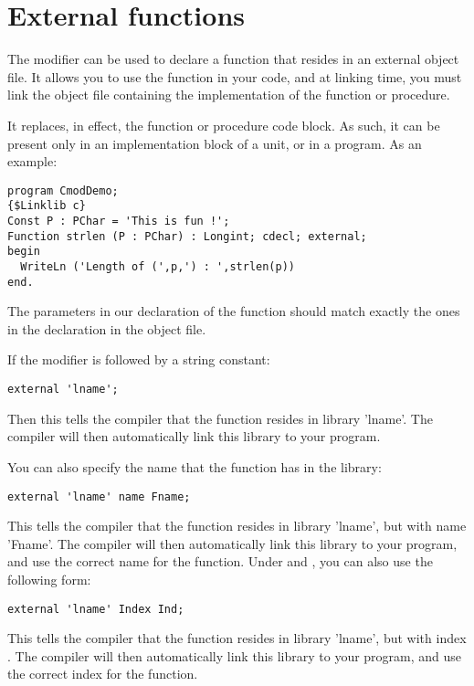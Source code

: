 \documentclass{report}
\begin{document}
\section{External functions}
\label{se:external}
The  modifier can be used to declare a function that resides in
an external object file. It allows you to use the function in
your code, and at linking time, you must link the object file containing the
implementation of the function or procedure.

It replaces, in effect, the function or procedure code block. As such, it
can be present only in an implementation block of a unit, or in a program.
As an example:
\begin{verbatim}
program CmodDemo;
{$Linklib c}
Const P : PChar = 'This is fun !';
Function strlen (P : PChar) : Longint; cdecl; external;
begin
  WriteLn ('Length of (',p,') : ',strlen(p))
end.
\end{verbatim}
\begin{remark}
The parameters in our declaration of the  function
should match exactly the ones in the declaration in the object file.
\end{remark}
If the  modifier is followed by a string constant:
\begin{verbatim}
external 'lname';
\end{verbatim}
Then this tells the compiler that the function resides in library
'lname'. The compiler will then automatically link this library to
your program.

You can also specify the name that the function has in the library:
\begin{verbatim}
external 'lname' name Fname;
\end{verbatim}
This tells the compiler that the function resides in library 'lname',
but with name 'Fname'. The compiler will then automatically link this
library to your program, and use the correct name for the function.
Under \windows and \ostwo, you can also use the following form:
\begin{verbatim}
external 'lname' Index Ind;
\end{verbatim}
This tells the compiler that the function resides in library 'lname',
but with index . The compiler will then automatically
link this library to your program, and use the correct index for the
function.

\end{document}
